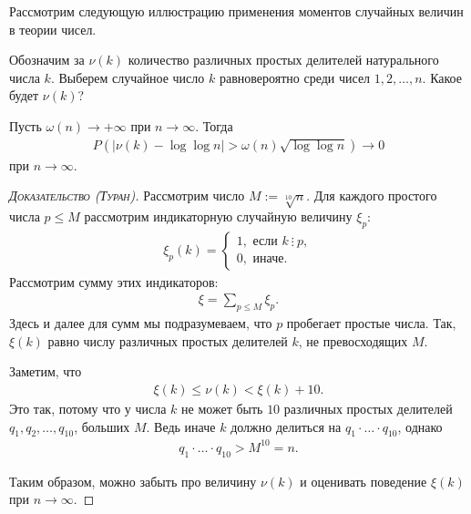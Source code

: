 \documentclass[../main.tex]{subfiles}
\begin{document}
Рассмотрим следующую иллюстрацию применения моментов случайных величин  в теории чисел.

\begin{problem}
 Обозначим за $ \nu(k) $ количество различных простых делителей натурального числа $ k $. Выберем случайное число $ k $ равновероятно среди чисел $ 1, 2, \ldots, n $. Какое будет $ \nu(k) $?
\end{problem}
\begin{thm}
 Пусть $ \omega(n) \to +\infty $ при $ n \to \infty $. Тогда
 \begin{align*}
  P( \left| \nu(k) - \log\log n \right| > \omega(n) \sqrt{\log\log n}) \to 0
 \end{align*}  при $ n \to \infty $.
\end{thm}
\begin{proof}[\normalfont\textsc{Доказательство (Туран)}]
 Рассмотрим число $ M := \sqrt[10] n $. Для каждого простого числа $ p \leqslant M $ рассмотрим индикаторную случайную величину $ \xi_p $:
 \begin{align*}
  \xi_p(k) = \begin{cases}
   1, \text{ если } k \ \vdots \ p, \\
   0, \text{ иначе. }
  \end{cases}
 \end{align*} Рассмотрим сумму этих индикаторов:
 \begin{align*}
  \xi = \sum_{p \leqslant M} \xi_p.
 \end{align*} Здесь и далее для сумм мы подразумеваем, что $ p $ пробегает простые числа. Так, $ \xi(k) $ равно числу различных простых делителей $ k $, не превосходящих $M$.

 Заметим, что
 \begin{align}
  \label{eq:hardy_ramanujan_xi_and_nu}
  \xi(k) \leqslant \nu(k) < \xi(k) + 10.
 \end{align} Это так, потому что у числа $ k $ не может быть $ 10 $ различных простых делителей $ q_1, q_2, \ldots, q_{10} $, больших $ M $. Ведь иначе $ k $ должно делиться на $ q_1 \cdot \ldots \cdot q_{10} $, однако
 \begin{align*}
  q_1 \cdot \ldots \cdot q_{10} > M^{10} = n.
 \end{align*}

 Таким образом, можно забыть про величину $ \nu(k) $ и оценивать поведение $ \xi(k) $ при $ n \to \infty $.


\end{proof}
\end{document}
